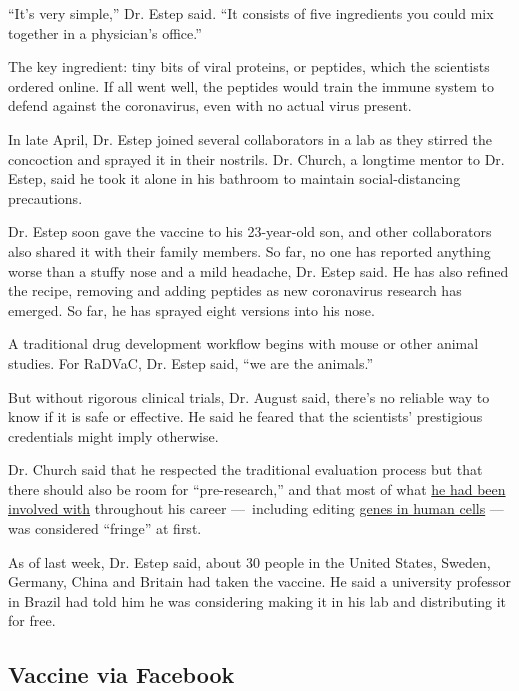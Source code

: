 ``It's very simple,'' Dr. Estep said. ``It consists of five ingredients
you could mix together in a physician's office.''

The key ingredient: tiny bits of viral proteins, or peptides, which the
scientists ordered online. If all went well, the peptides would train
the immune system to defend against the coronavirus, even with no actual
virus present.

In late April, Dr. Estep joined several collaborators in a lab as they
stirred the concoction and sprayed it in their nostrils. Dr. Church, a
longtime mentor to Dr. Estep, said he took it alone in his bathroom to
maintain social-distancing precautions.

Dr. Estep soon gave the vaccine to his 23-year-old son, and other
collaborators also shared it with their family members. So far, no one
has reported anything worse than a stuffy nose and a mild headache, Dr.
Estep said. He has also refined the recipe, removing and adding peptides
as new coronavirus research has emerged. So far, he has sprayed eight
versions into his nose.

A traditional drug development workflow begins with mouse or other
animal studies. For RaDVaC, Dr. Estep said, ``we are the animals.''

But without rigorous clinical trials, Dr. August said, there's no
reliable way to know if it is safe or effective. He said he feared that
the scientists' prestigious credentials might imply otherwise.

Dr. Church said that he respected the traditional evaluation process but
that there should also be room for ``pre-research,'' and that most of
what \href{https://wyss.harvard.edu/team/core-faculty/george-church/}{he
had been involved with} throughout his career ---~including editing
\href{http://www.weizmann.ac.il/WeizmannCompass/sections/qa/prof-george-church}{genes
in human cells} --- was considered ``fringe'' at first.

As of last week, Dr. Estep said, about 30 people in the United States,
Sweden, Germany, China and Britain had taken the vaccine. He said a
university professor in Brazil had told him he was considering making it
in his lab and distributing it for free.

\hypertarget{vaccine-via-facebook}{%
\subsection{Vaccine via Facebook}\label{vaccine-via-facebook}}

